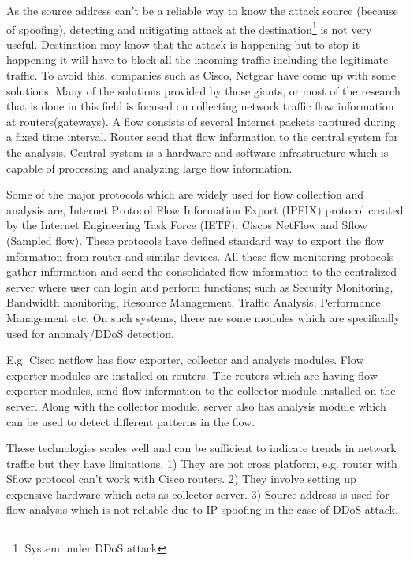 \documentclass[12pt,oneside,a4paper]{article}
\begin{document}
As the source address can't be a reliable way to know the attack source (because of spoofing), detecting and mitigating attack at the destination\footnote{System under DDoS attack} is not very useful. Destination may know that the attack is happening but to stop it happening it will have to block all the incoming traffic including the legitimate traffic. To avoid this, companies such as Cisco, Netgear have come up with some solutions. Many of the solutions provided by those giants, or most of the research that is done in this field is focused on collecting network traffic flow information\cite{network-traffic-flow} at routers(gateways). A flow consists of several Internet packets captured during a fixed time interval. Router send that flow information to the central system for the analysis. Central system is a hardware and software infrastructure which is capable of processing and analyzing large flow information.\par

Some of the major protocols which are widely used for flow collection and analysis are, Internet Protocol Flow Information Export (IPFIX) protocol created by the Internet Engineering Task Force (IETF), Ciscos NetFlow\cite{cisco-netflow} and Sflow (Sampled flow)\cite{sflow}. These protocols have defined standard way to export the flow information from router and similar devices. All these flow monitoring protocols gather information and send the consolidated flow information to the centralized server where user can login and perform functions; such as Security Monitoring, Bandwidth monitoring, Resource Management, Traffic Analysis, Performance Management etc. On such systems, there are some modules which are specifically used for anomaly/DDoS detection.\par

E.g. Cisco netflow has flow exporter, collector and analysis modules. Flow exporter modules are installed on routers. The routers which are having flow exporter modules, send flow information to the collector module installed on the server. Along with the collector module, server also has analysis module which can be used to detect different patterns in the flow.\par

These technologies scales well and can be sufficient to indicate trends in network traffic but they have limitations. 1) They are not cross platform, e.g. router with Sflow protocol can't work with Cisco routers. 2) They involve setting up expensive hardware which acts as collector server. 3) Source address is used for flow analysis which is not reliable due to IP spoofing in the case of DDoS attack.\par
\end{document}
